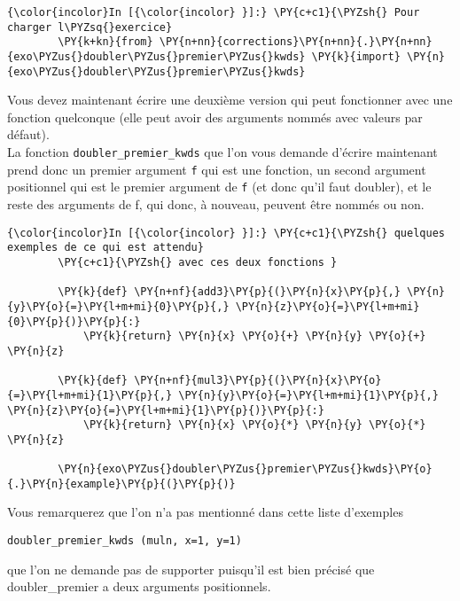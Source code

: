     \begin{Verbatim}[commandchars=\\\{\}]
{\color{incolor}In [{\color{incolor} }]:} \PY{c+c1}{\PYZsh{} Pour charger l\PYZsq{}exercice}
        \PY{k+kn}{from} \PY{n+nn}{corrections}\PY{n+nn}{.}\PY{n+nn}{exo\PYZus{}doubler\PYZus{}premier\PYZus{}kwds} \PY{k}{import} \PY{n}{exo\PYZus{}doubler\PYZus{}premier\PYZus{}kwds}
\end{Verbatim}


    Vous devez maintenant écrire une deuxième version qui peut fonctionner
avec une fonction quelconque (elle peut avoir des arguments nommés avec
valeurs par défaut).\\

La fonction \texttt{doubler\_premier\_kwds} que l'on vous demande
d'écrire maintenant prend donc un premier argument \texttt{f} qui est
une fonction, un second argument positionnel qui est le premier argument
de \texttt{f} (et donc qu'il faut doubler), et le reste des arguments de
f, qui donc, à nouveau, peuvent être nommés ou non.

    \begin{Verbatim}[commandchars=\\\{\}]
{\color{incolor}In [{\color{incolor} }]:} \PY{c+c1}{\PYZsh{} quelques exemples de ce qui est attendu}
        \PY{c+c1}{\PYZsh{} avec ces deux fonctions }
        
        \PY{k}{def} \PY{n+nf}{add3}\PY{p}{(}\PY{n}{x}\PY{p}{,} \PY{n}{y}\PY{o}{=}\PY{l+m+mi}{0}\PY{p}{,} \PY{n}{z}\PY{o}{=}\PY{l+m+mi}{0}\PY{p}{)}\PY{p}{:}
            \PY{k}{return} \PY{n}{x} \PY{o}{+} \PY{n}{y} \PY{o}{+} \PY{n}{z}
        
        \PY{k}{def} \PY{n+nf}{mul3}\PY{p}{(}\PY{n}{x}\PY{o}{=}\PY{l+m+mi}{1}\PY{p}{,} \PY{n}{y}\PY{o}{=}\PY{l+m+mi}{1}\PY{p}{,} \PY{n}{z}\PY{o}{=}\PY{l+m+mi}{1}\PY{p}{)}\PY{p}{:}
            \PY{k}{return} \PY{n}{x} \PY{o}{*} \PY{n}{y} \PY{o}{*} \PY{n}{z}
        
        \PY{n}{exo\PYZus{}doubler\PYZus{}premier\PYZus{}kwds}\PY{o}{.}\PY{n}{example}\PY{p}{(}\PY{p}{)}
\end{Verbatim}


    Vous remarquerez que l'on n'a pas mentionné dans cette liste d'exemples

\begin{verbatim}
doubler_premier_kwds (muln, x=1, y=1)
\end{verbatim}

que l'on ne demande pas de supporter puisqu'il est bien précisé que
doubler\_premier a deux arguments positionnels.

